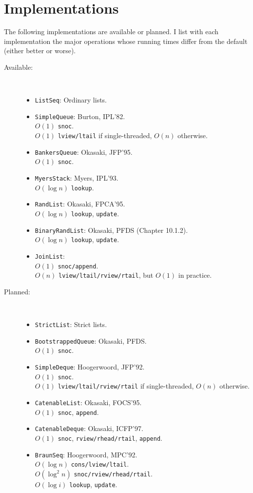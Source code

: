 \documentclass{report}
\newcommand{\cd}{\texttt}
\newcommand{\nl}{\hspace*{0pt}\\}
\newcommand{\impl}[1]{\item \texttt{#1}:}
\newcommand{\hsp}{\hspace*{15pt}}
\begin{document}
\section{Implementations}

The following implementations are available or planned.
I list with each implementation the major operations whose running times 
differ from the default (either better or worse).

\begin{description}
\item[Available:] \nl \vspace*{-15pt}
\begin{itemize}
\impl{ListSeq} Ordinary lists.
\impl{SimpleQueue} Burton, IPL'82. \\
     \hsp $O(1)$ \cd{snoc}. \\
     \hsp $O(1)$ \cd{lview/ltail} if single-threaded, $O(n)$ otherwise.
\impl{BankersQueue} Okasaki, JFP'95. \\
     \hsp $O(1)$ \cd{snoc}.
\impl{MyersStack} Myers, IPL'93. \\
     \hsp $O(\log n)$ \cd{lookup}.
\impl{RandList} Okasaki, FPCA'95. \\
     \hsp $O(\log n)$ \cd{lookup}, \cd{update}.
\impl{BinaryRandList} Okasaki, PFDS (Chapter 10.1.2). \\
     \hsp $O(\log n)$ \cd{lookup}, \cd{update}.
\impl{JoinList} \\
     \hsp $O(1)$ \cd{snoc/append}. \\
     \hsp $O(n)$ \cd{lview/ltail/rview/rtail}, but $O(1)$ in practice.
\end{itemize}

\item[Planned:] \nl \vspace*{-15pt}
\begin{itemize}
\impl{StrictList} Strict lists.
\impl{BootstrappedQueue} Okasaki, PFDS. \\
     \hsp $O(1)$ \cd{snoc}.
\impl{SimpleDeque} Hoogerwoord, JFP'92. \\
     \hsp $O(1)$ \cd{snoc}. \\
     \hsp $O(1)$ \cd{lview/ltail/rview/rtail} if single-threaded, 
          $O(n)$ otherwise.
\impl{CatenableList} Okasaki, FOCS'95. \\
     \hsp $O(1)$ \cd{snoc}, \cd{append}.
\impl{CatenableDeque} Okasaki, ICFP'97. \\
     \hsp $O(1)$ \cd{snoc}, \cd{rview/rhead/rtail}, \cd{append}.
\impl{BraunSeq} Hoogerwoord, MPC'92. \\
     \hsp $O(\log n)$ \cd{cons/lview/ltail}. \\
     \hsp $O(\log^2 n)$ \cd{snoc/rview/rhead/rtail}. \\
     \hsp $O(\log i)$ \cd{lookup}, \cd{update}.
\end{itemize}
\end{description}
\end{document}
